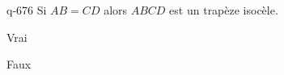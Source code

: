 \begin{truefalse}{q-676}
Si $AB=CD$ alors $ABCD$ est un trapèze isocèle.
\item Vrai
\item* Faux
\end{truefalse}

